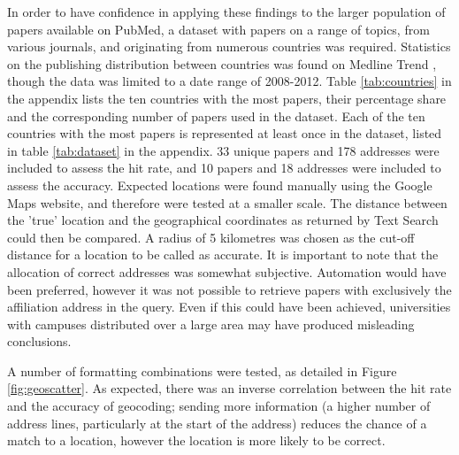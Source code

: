 \documentclass[Report.tex]{subfiles}
\begin{document}
\noindent In order to have confidence in applying these findings to the larger population of papers available on PubMed, a dataset with papers on a range of topics, from various journals, and originating from numerous countries was required. Statistics on the publishing distribution between countries was found on Medline Trend \cite{medlinetrend},  though the data was limited to a date range of 2008-2012. Table \ref{tab:countries} in the appendix lists the ten countries with the most papers, their percentage share and the corresponding number of papers used in the dataset. Each of the ten countries with the most papers is represented at least once in the dataset, listed in table \ref{tab:dataset} in the appendix. 33 unique papers and 178 addresses were included to assess the hit rate, and 10 papers and 18 addresses were included to assess the accuracy. Expected locations were found manually using the Google Maps website, and therefore were tested at a smaller scale. The distance between the 'true' location and the geographical coordinates as returned by Text Search could then be compared. A radius of 5 kilometres was chosen as the cut-off distance for a location to be called as accurate. It is important to note that the allocation of correct addresses was somewhat subjective. Automation would have been preferred, however it was not possible to retrieve papers with exclusively the affiliation address in the query. Even if this could have been achieved, universities with campuses distributed over a large area may have produced misleading conclusions.\newline

\noindent A number of formatting combinations were tested, as detailed in Figure \ref{fig:geoscatter}. As expected, there was an inverse correlation between the hit rate and the accuracy of geocoding; sending more information (a higher number of address lines, particularly at the start of the address) reduces the chance of a match to a location, however the location is more likely to be correct.\newline
\end{document}

